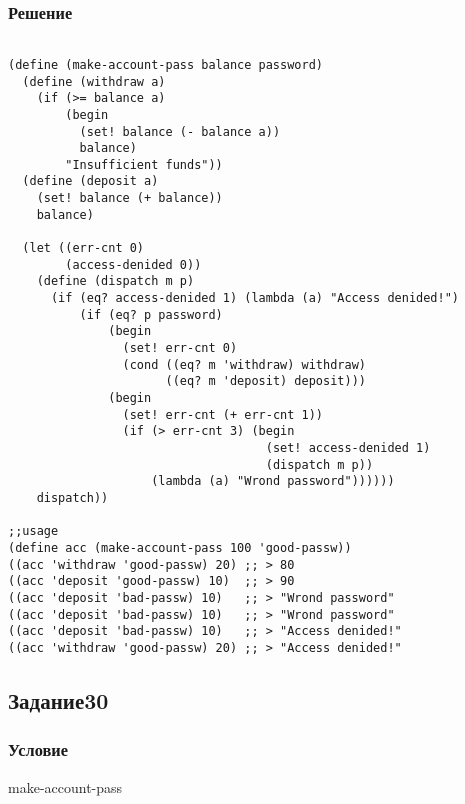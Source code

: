 \documentclass[10pt,a4paper]{article}
\begin{document}
\subsubsection*{Решение}
\begin{lstlisting}

(define (make-account-pass balance password)
  (define (withdraw a)
    (if (>= balance a)
        (begin
          (set! balance (- balance a))
          balance)
        "Insufficient funds"))
  (define (deposit a)
    (set! balance (+ balance))
    balance)
  
  (let ((err-cnt 0)
        (access-denided 0))
    (define (dispatch m p)
      (if (eq? access-denided 1) (lambda (a) "Access denided!")
          (if (eq? p password)
              (begin
                (set! err-cnt 0)
                (cond ((eq? m 'withdraw) withdraw)
                      ((eq? m 'deposit) deposit)))
              (begin
                (set! err-cnt (+ err-cnt 1))
                (if (> err-cnt 3) (begin
                                    (set! access-denided 1)
                                    (dispatch m p))
                    (lambda (a) "Wrond password"))))))
    dispatch))

;;usage
(define acc (make-account-pass 100 'good-passw))
((acc 'withdraw 'good-passw) 20) ;; > 80
((acc 'deposit 'good-passw) 10)  ;; > 90
((acc 'deposit 'bad-passw) 10)   ;; > "Wrond password"
((acc 'deposit 'bad-passw) 10)   ;; > "Wrond password"
((acc 'deposit 'bad-passw) 10)   ;; > "Access denided!"
((acc 'withdraw 'good-passw) 20) ;; > "Access denided!"
\end{lstlisting}

\subsection*{Задание30}
\subsubsection*{Условие}
make-account-pass
\end{document}
